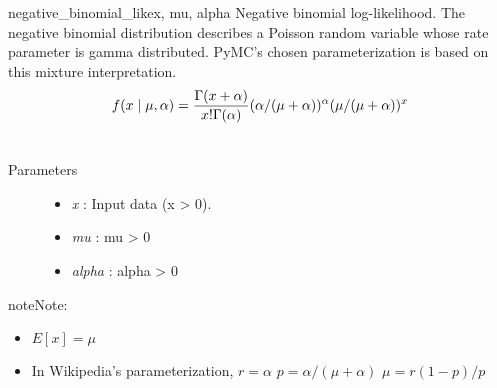 \hypertarget{pymc.distributions.negative_binomial_like}{}\begin{funcdesc}{negative\_binomial\_like}{x, mu, alpha}
Negative binomial log-likelihood. The negative binomial distribution describes a
Poisson random variable whose rate parameter is gamma distributed. PyMC's chosen
parameterization is based on this mixture interpretation.
\begin{gather}
\begin{split}f(x \mid \mu, \alpha) = \frac{\Gamma(x+\alpha)}{x! \Gamma(\alpha)} (\alpha/(\mu+\alpha))^\alpha (\mu/(\mu+\alpha))^x\end{split}\notag\\\begin{split}\end{split}\notag
\end{gather}\begin{description}
\item[Parameters] \leavevmode\begin{itemize}
\item {} 
\emph{x} : Input data (x \textgreater{} 0).

\item {} 
\emph{mu} : mu \textgreater{} 0

\item {} 
\emph{alpha} : alpha \textgreater{} 0

\end{itemize}

\end{description}

\begin{notice}{note}{Note:}\begin{itemize}
\item {} 
$E[x]=\mu$

\item {} 
In Wikipedia's parameterization,
$r=\alpha$
$p=\alpha/(\mu+\alpha)$
$\mu=r(1-p)/p$

\end{itemize}
\end{notice}
\end{funcdesc}

